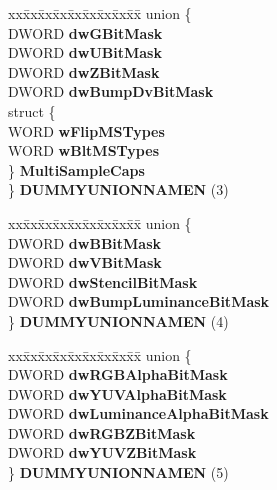 \begin{DoxyCompactItemize}
\begin{tabbing}
\end{tabbing}\item 
\mbox{\label{struct___d_d_p_i_x_e_l_f_o_r_m_a_t_a5b2b2a8ca136e923f1dafe3f4d3d1bb3}} 
\begin{tabbing}
xx\=xx\=xx\=xx\=xx\=xx\=xx\=xx\=xx\=\kill
union \{\\
\>DWORD {\bfseries dwGBitMask}\\
\>DWORD {\bfseries dwUBitMask}\\
\>DWORD {\bfseries dwZBitMask}\\
\>DWORD {\bfseries dwBumpDvBitMask}\\
\>struct \{\\
\>\>WORD {\bfseries wFlipMSTypes}\\
\>\>WORD {\bfseries wBltMSTypes}\\
\>\} {\bfseries MultiSampleCaps}\\
\} {\bfseries DUMMYUNIONNAMEN} (3)\\

\end{tabbing}\item 
\mbox{\label{struct___d_d_p_i_x_e_l_f_o_r_m_a_t_a877533524e79fe5ff9c980619ca79918}} 
\begin{tabbing}
xx\=xx\=xx\=xx\=xx\=xx\=xx\=xx\=xx\=\kill
union \{\\
\>DWORD {\bfseries dwBBitMask}\\
\>DWORD {\bfseries dwVBitMask}\\
\>DWORD {\bfseries dwStencilBitMask}\\
\>DWORD {\bfseries dwBumpLuminanceBitMask}\\
\} {\bfseries DUMMYUNIONNAMEN} (4)\\

\end{tabbing}\item 
\mbox{\label{struct___d_d_p_i_x_e_l_f_o_r_m_a_t_a9ccc6359ff545d0aa6432bdc9728e578}} 
\begin{tabbing}
xx\=xx\=xx\=xx\=xx\=xx\=xx\=xx\=xx\=\kill
union \{\\
\>DWORD {\bfseries dwRGBAlphaBitMask}\\
\>DWORD {\bfseries dwYUVAlphaBitMask}\\
\>DWORD {\bfseries dwLuminanceAlphaBitMask}\\
\>DWORD {\bfseries dwRGBZBitMask}\\
\>DWORD {\bfseries dwYUVZBitMask}\\
\} {\bfseries DUMMYUNIONNAMEN} (5)\\

\end{tabbing}\end{DoxyCompactItemize}
